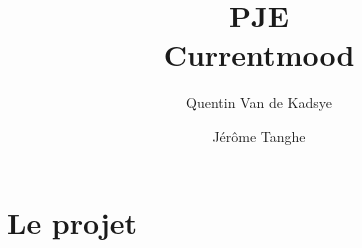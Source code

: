 \documentclass[12pt,a4paper]{report}
\title{PJE\\Currentmood}
\author{Quentin Van de Kadsye \and Jérôme Tanghe}
\begin{document}
\maketitle

\tableofcontents

\section{Le projet}
\end{document}
